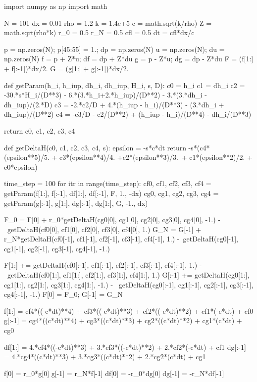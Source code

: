 \documentclass[dvipdfmx, 9pt, a4paper]{jsarticle}
\begin{document}
\begin{python}
import numpy as np
import math

N = 101
dx = 0.01
rho = 1.2
k = 1.4e+5
c = math.sqrt(k/rho)
Z = math.sqrt(rho*k)
r_0 = 0.5
r_N = 0.5
cfl = 0.5
dt = cfl*dx/c

p = np.zeros(N); p[45:55] = 1.; dp = np.zeros(N)
u = np.zeros(N); du = np.zeros(N)
f = p + Z*u; df = dp + Z*du
g = p - Z*u; dg = dp - Z*du
F = (f[1:] + f[:-1])*dx/2.
G = (g[1:] + g[:-1])*dx/2.


def getParam(h_i, h_iup, dh_i, dh_iup, H_i, s, D):
	c0 = h_i
	c1 = dh_i
	c2 = -30.*s*H_i/(D**3) - 6.*(3.*h_i+2.*h_iup)/(D**2) - 3.*(3.*dh_i - dh_iup)/(2.*D)
	c3 = -2.*c2/D + 4.*(h_iup - h_i)/(D**3) - (3.*dh_i + dh_iup)/(D**2)
	c4 = -c3/D - c2/(D**2) + (h_iup - h_i)/(D**4) - dh_i/(D**3)

	return c0, c1, c2, c3, c4

def getDeltaH(c0, c1, c2, c3, c4, s):
	epsilon = -s*c*dt
	return -s*(c4*(epsilon**5)/5. + c3*(epsilon**4)/4. +c2*(epsilon**3)/3.\
		+ c1*(epsilon**2)/2. + c0*epsilon)


time_step = 100
for itr in range(time_step):
	cf0, cf1, cf2, cf3, cf4 = getParam(f[1:], f[:-1], df[1:], df[:-1], F, 1., -dx)
	cg0, cg1, cg2, cg3, cg4 = getParam(g[:-1], g[1:], dg[:-1], dg[1:], G, -1., dx)

	F_0 = F[0] + r_0*getDeltaH(cg0[0], cg1[0], cg2[0], cg3[0], cg4[0], -1.) -\
		getDeltaH(cf0[0], cf1[0], cf2[0], cf3[0], cf4[0], 1.)
	G_N = G[-1] + r_N*getDeltaH(cf0[-1], cf1[-1], cf2[-1], cf3[-1], cf4[-1], 1.) -\
		getDeltaH(cg0[-1], cg1[-1], cg2[-1], cg3[-1], cg4[-1], -1.)

	F[1:] += getDeltaH(cf0[:-1], cf1[:-1], cf2[:-1], cf3[:-1], cf4[:-1], 1.) - \
		getDeltaH(cf0[1:], cf1[1:], cf2[1:], cf3[1:], cf4[1:], 1.)
	G[:-1] += getDeltaH(cg0[1:], cg1[1:], cg2[1:], cg3[1:], cg4[1:], -1.) - \
		getDeltaH(cg0[:-1], cg1[:-1], cg2[:-1], cg3[:-1], cg4[:-1], -1.)
	F[0] = F_0; G[-1] = G_N

	f[1:] = cf4*((-c*dt)**4) + cf3*((-c*dt)**3) + cf2*((-c*dt)**2) + cf1*(-c*dt) + cf0
	g[:-1] = cg4*((c*dt)**4) + cg3*((c*dt)**3) + cg2*((c*dt)**2) + cg1*(c*dt) + cg0

	df[1:] = 4.*cf4*((-c*dt)**3) + 3.*cf3*((-c*dt)**2) + 2.*cf2*(-c*dt) + cf1
	dg[:-1] = 4.*cg4*((c*dt)**3) + 3.*cg3*((c*dt)**2) + 2.*cg2*(c*dt) + cg1

	f[0] = r_0*g[0]
	g[-1] = r_N*f[-1]
	df[0] = -r_0*dg[0]
	dg[-1] = -r_N*df[-1]
\end{python}
\end{document}
